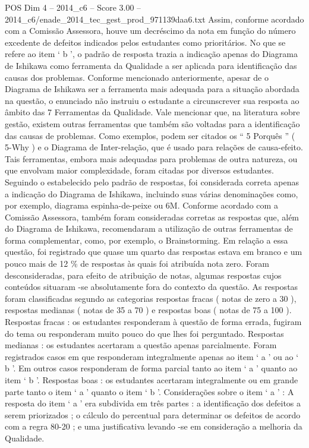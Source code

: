 \begin{textsample}{POS Dim 4 – 2014\_c6 – Score 3.00 – 2014\_c6/enade\_2014\_tec\_gest\_prod\_971139daa6.txt}
Assim, conforme acordado com a Comissão Assessora, houve um decréscimo da nota em função do número excedente de defeitos indicados pelos estudantes como prioritários.
No que se refere ao item ‘ b ’, o padrão de resposta trazia a indicação apenas do Diagrama de Ishikawa como ferramenta da Qualidade a ser aplicada para identificação das causas dos problemas.
Conforme mencionado anteriormente, apesar de o Diagrama de Ishikawa ser a ferramenta mais adequada para a situação abordada na questão, o enunciado não instruiu o estudante a circunscrever sua resposta ao âmbito das 7 Ferramentas da Qualidade.
Vale mencionar que, na literatura sobre gestão, existem outras ferramentas que também são voltadas para a identificação das causas de problemas.
Como exemplos, podem ser citados os “ 5 Porquês ” ( 5-Why ) e o Diagrama de Inter-relação, que é usado para relações de causa-efeito.
Tais ferramentas, embora mais adequadas para problemas de outra natureza, ou que envolvam maior complexidade, foram citadas por diversos estudantes.
Seguindo o estabelecido pelo padrão de respostas, foi considerada correta apenas a indicação do Diagrama de Ishikawa, incluindo suas várias denominações como, por exemplo, diagrama espinha-de-peixe ou 6M.
Conforme acordado com a Comissão Assessora, também foram consideradas corretas as respostas que, além do Diagrama de Ishikawa, recomendaram a utilização de outras ferramentas de forma complementar, como, por exemplo, o Brainstorming.
Em relação a essa questão, foi registrado que quase um quarto das respostas estava em branco e um pouco mais de 12 \% de respostas às quais foi atribuída nota zero.
Foram desconsideradas, para efeito de atribuição de notas, algumas respostas cujos conteúdos situaram -se absolutamente fora do contexto da questão.
As respostas foram classificadas segundo as categorias respostas fracas ( notas de zero a 30 ), respostas medianas ( notas de 35 a 70 ) e respostas boas ( notas de 75 a 100 ).
Respostas fracas : os estudantes responderam à questão de forma errada, fugiram do tema ou responderam muito pouco do que lhes foi perguntado.
Respostas medianas : os estudantes acertaram a questão apenas parcialmente.
Foram registrados casos em que responderam integralmente apenas ao item ‘ a ’ ou ao ‘ b ’.
Em outros casos responderam de forma parcial tanto ao item ‘ a ’ quanto ao item ‘ b ’.
Respostas boas : os estudantes acertaram integralmente ou em grande parte tanto o item ‘ a ’ quanto o item ‘ b ’.
Considerações sobre o item ‘ a ’ : A resposta do item ‘ a ’ era subdivida em três partes : a identificação dos defeitos a serem priorizados ; o cálculo do percentual para determinar os defeitos de acordo com a regra 80-20 ; e uma justificativa levando -se em consideração a melhoria da Qualidade.

\end{textsample}
